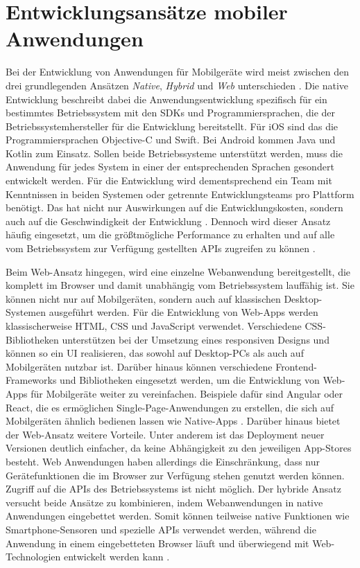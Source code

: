 \section{Entwicklungsansätze mobiler Anwendungen}
\label{sec:Entwicklungsansaetze}

Bei der Entwicklung von Anwendungen für Mobilgeräte wird meist zwischen den drei grundlegenden Ansätzen \textit{Native}, \textit{Hybrid} und \textit{Web} unterschieden \cite{Nunkesser_Taxonomy_Apps, Que_Comparison_Hybrid_Native}.
Die native Entwicklung beschreibt dabei die Anwendungsentwicklung spezifisch für ein bestimmtes Betriebssystem mit den \acp{SDK} und Programmiersprachen, die der Betriebssystemhersteller für die Entwicklung bereitstellt.
Für iOS sind das die Programmiersprachen Objective-C und Swift.
Bei Android kommen Java und Kotlin zum Einsatz.
Sollen beide Betriebssysteme unterstützt werden, muss die Anwendung für jedes System in einer der entsprechenden Sprachen gesondert entwickelt werden.
Für die Entwicklung wird dementsprechend ein Team mit Kenntnissen in beiden Systemen oder getrennte Entwicklungsteams pro Plattform benötigt.
Das hat nicht nur Auswirkungen auf die Entwicklungskosten, sondern auch auf die Geschwindigkeit der Entwicklung \cite{Manchanda_CrossPlatformFrameworks}.
Dennoch wird dieser Ansatz häufig eingesetzt, um die größtmögliche Performance zu erhalten und auf alle vom Betriebssystem zur Verfügung gestellten \acp{API} zugreifen zu können \cite{Pinto_Native_to_Cross_Platform}.

Beim Web-Ansatz hingegen, wird eine einzelne Webanwendung bereitgestellt, die komplett im Browser und damit unabhängig vom Betriebssystem lauffähig ist.
Sie können nicht nur auf Mobilgeräten, sondern auch auf klassischen Desktop-Systemen ausgeführt werden.
Für die Entwicklung von Web-Apps werden klassischerweise \ac{HTML}, \ac{CSS} und JavaScript verwendet.
Verschiedene \ac{CSS}-Bibliotheken unterstützen bei der Umsetzung eines responsiven Designs und können so ein \ac{UI} realisieren, das sowohl auf Desktop-PCs als auch auf Mobilgeräten nutzbar ist.
Darüber hinaus können verschiedene Frontend-Frameworks und Bibliotheken eingesetzt werden, um die Entwicklung von Web-Apps für Mobilgeräte weiter zu vereinfachen.
Beispiele dafür sind Angular oder React, die es ermöglichen Single-Page-Anwendungen zu erstellen, die sich auf Mobilgeräten ähnlich bedienen lassen wie Native-Apps \cite{Pinto_Native_to_Cross_Platform}.
Darüber hinaus bietet der Web-Ansatz weitere Vorteile. 
Unter anderem ist das Deployment neuer Versionen deutlich einfacher, da keine Abhängigkeit zu den jeweiligen App-Stores besteht.
Web Anwendungen haben allerdings die Einschränkung, dass nur Gerätefunktionen die im Browser zur Verfügung stehen genutzt werden können. 
Zugriff auf die \acp{API} des Betriebssystems ist nicht möglich.
Der hybride Ansatz versucht beide Ansätze zu kombinieren, indem Webanwendungen in native Anwendungen eingebettet werden.
Somit können teilweise native Funktionen wie Smartphone-Sensoren und spezielle \acp{API} verwendet werden, während die Anwendung in einem eingebetteten Browser läuft und überwiegend mit Web-Technologien entwickelt werden kann \cite{Nunkesser_Taxonomy_Apps}.

